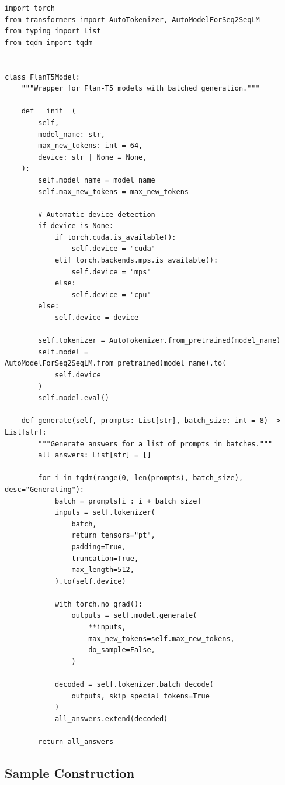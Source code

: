 \documentclass[11pt,a4paper]{article}
\begin{document}
\begin{lstlisting}[caption=FlanT5 model wrapper, label=lst:model, basicstyle=\ttfamily\footnotesize]
import torch
from transformers import AutoTokenizer, AutoModelForSeq2SeqLM
from typing import List
from tqdm import tqdm


class FlanT5Model:
    """Wrapper for Flan-T5 models with batched generation."""
    
    def __init__(
        self,
        model_name: str,
        max_new_tokens: int = 64,
        device: str | None = None,
    ):
        self.model_name = model_name
        self.max_new_tokens = max_new_tokens
        
        # Automatic device detection
        if device is None:
            if torch.cuda.is_available():
                self.device = "cuda"
            elif torch.backends.mps.is_available():
                self.device = "mps"
            else:
                self.device = "cpu"
        else:
            self.device = device
        
        self.tokenizer = AutoTokenizer.from_pretrained(model_name)
        self.model = AutoModelForSeq2SeqLM.from_pretrained(model_name).to(
            self.device
        )
        self.model.eval()
    
    def generate(self, prompts: List[str], batch_size: int = 8) -> List[str]:
        """Generate answers for a list of prompts in batches."""
        all_answers: List[str] = []
        
        for i in tqdm(range(0, len(prompts), batch_size), desc="Generating"):
            batch = prompts[i : i + batch_size]
            inputs = self.tokenizer(
                batch,
                return_tensors="pt",
                padding=True,
                truncation=True,
                max_length=512,
            ).to(self.device)
            
            with torch.no_grad():
                outputs = self.model.generate(
                    **inputs,
                    max_new_tokens=self.max_new_tokens,
                    do_sample=False,
                )
            
            decoded = self.tokenizer.batch_decode(
                outputs, skip_special_tokens=True
            )
            all_answers.extend(decoded)
        
        return all_answers
\end{lstlisting}

\subsection{Sample Construction}
\end{document}

